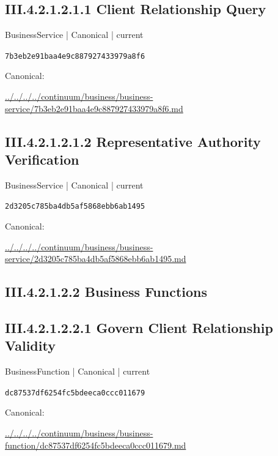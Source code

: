\documentclass[10pt,a4paper]{article}
\begin{document}
\subsection*{III.4.2.1.2.1.1 Client Relationship Query}
\label{element-7b3eb2e91baa4e9c887927433979a8f6}
{\small BusinessService | Canonical | current}\par
\texttt{7b3eb2e91baa4e9c887927433979a8f6}\par
Canonical: \par
{\footnotesize\url{../../../../continuum/business/business-service/7b3eb2e91baa4e9c887927433979a8f6.md}}\par
\subsection*{III.4.2.1.2.1.2 Representative Authority Verification}
\label{element-2d3205c785ba4db5af5868ebb6ab1495}
{\small BusinessService | Canonical | current}\par
\texttt{2d3205c785ba4db5af5868ebb6ab1495}\par
Canonical: \par
{\footnotesize\url{../../../../continuum/business/business-service/2d3205c785ba4db5af5868ebb6ab1495.md}}\par
\subsection*{III.4.2.1.2.2 Business Functions}
\subsection*{III.4.2.1.2.2.1 Govern Client Relationship Validity}
\label{element-dc87537df6254fc5bdeeca0ccc011679}
{\small BusinessFunction | Canonical | current}\par
\texttt{dc87537df6254fc5bdeeca0ccc011679}\par
Canonical: \par
{\footnotesize\url{../../../../continuum/business/business-function/dc87537df6254fc5bdeeca0ccc011679.md}}\par
\end{document}
